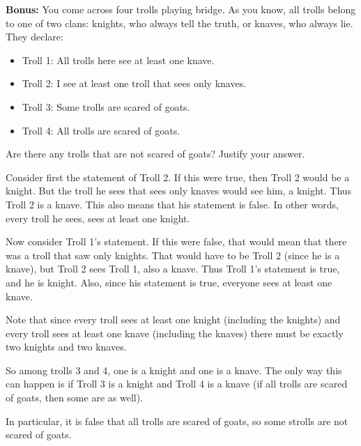 \documentclass[10pt]{exam}
\begin{document}
\begin{questions}
	\bonusquestion[5] \textbf{Bonus:} You come across four trolls playing bridge.  As you know, all trolls belong to one of two clans: knights, who always tell the truth, or knaves, who always lie.  They declare:
	\begin{itemize}
	\item[] Troll 1: All trolls here see at least one knave.

	\item[] Troll 2: I see at least one troll that sees only knaves.

	\item[] Troll 3: Some trolls are scared of goats.

	\item[] Troll 4: All trolls are scared of goats.
	\end{itemize}

	Are there any trolls that are not scared of goats?  Justify your answer.

	\begin{solution}
	Consider first the statement of Troll 2.  If this were true, then Troll 2 would be a knight.  But the troll he sees that sees only knaves would see him, a knight.  Thus Troll 2 is a knave.  This also means that his statement is false.  In other words, every troll he sees, sees at least one knight.

	Now consider Troll 1's statement.  If this were false, that would mean that there was a troll that saw only knights.  That would have to be Troll 2 (since he is a knave), but Troll 2 sees Troll 1, also a knave.  Thus Troll 1's statement is true, and he is knight.  Also, since his statement is true, everyone sees at least one knave.

	Note that since every troll sees at least one knight (including the knights) and every troll sees at least one knave (including the knaves) there must be exactly two knights and two knaves.

	So among trolls 3 and 4, one is a knight and one is a knave.  The only way this can happen is if Troll 3 is a knight and Troll 4 is a knave (if all trolls are scared of goats, then some are as well).

	In particular, it is false that all trolls are scared of goats, so some strolls are not scared of goats.


	\end{solution}




\end{questions}
\end{document}
